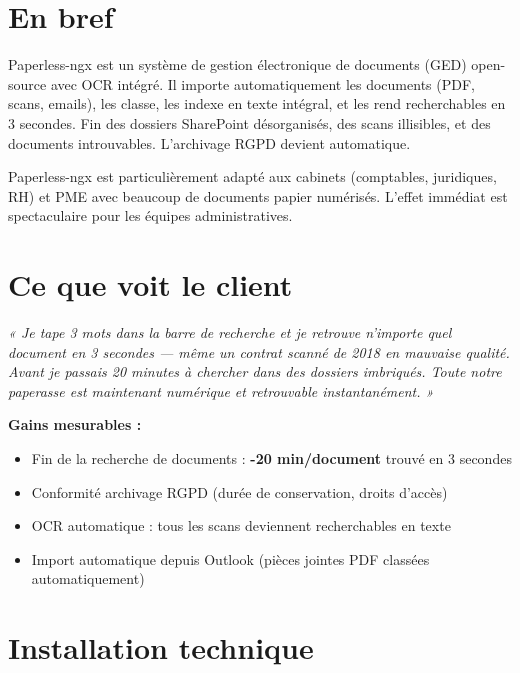 \documentclass[11pt, a4paper]{article}
\begin{document}
\ficheHeader

\section*{En bref}
Paperless-ngx est un système de gestion électronique de documents (GED) open-source avec OCR intégré. Il importe automatiquement les documents (PDF, scans, emails), les classe, les indexe en texte intégral, et les rend recherchables en 3 secondes. Fin des dossiers SharePoint désorganisés, des scans illisibles, et des documents introuvables. L'archivage RGPD devient automatique.

\begin{pointcle}
  Paperless-ngx est particulièrement adapté aux cabinets (comptables, juridiques, RH) et PME avec beaucoup de documents papier numérisés. L'effet immédiat est spectaculaire pour les équipes administratives.
\end{pointcle}

\section{Ce que voit le client}

\begin{clientbox}
  \textit{« Je tape 3 mots dans la barre de recherche et je retrouve n'importe quel document en 3 secondes — même un contrat scanné de 2018 en mauvaise qualité. Avant je passais 20 minutes à chercher dans des dossiers imbriqués. Toute notre paperasse est maintenant numérique et retrouvable instantanément. »}
\end{clientbox}

\textbf{Gains mesurables :}
\begin{itemize}
  \item Fin de la recherche de documents : \textbf{-20 min/document} trouvé en 3 secondes
  \item Conformité archivage RGPD (durée de conservation, droits d'accès)
  \item OCR automatique : tous les scans deviennent recherchables en texte
  \item Import automatique depuis Outlook (pièces jointes PDF classées automatiquement)
\end{itemize}

\section{Installation technique}
\end{document}
